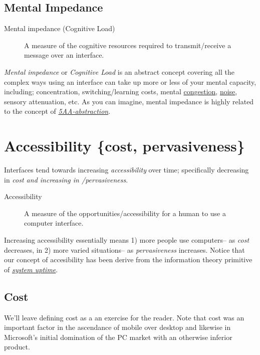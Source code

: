 \documentclass[logo,bsc,singlespacing,parskip]{infthesis}
\begin{document}
\subsection{Mental Impedance}
\label{sec:orgdfe7105}
\medskip
\begin{mdframed}
\begin{description}
\item[{Mental impedance\label{mental impedance} (Cognitive Load\label{cognitive load})}] A measure of the cognitive resources required to transmit/receive a message over an interface.
\end{description}
\end{mdframed}

\emph{Mental impedance} or \emph{Cognitive Load} is an abstract concept covering all the complex ways using an interface can take up more or less of your mental capacity, including; concentration, switching/learning costs, mental \hyperref[org8994918]{congestion}, \hyperref[noise]{noise}, sensory attenuation, etc.
As you can imagine, mental impedance is highly related to the concept of \emph{\hyperref[abstraction]{5AA-abstraction}}.

\section{Accessibility \{cost, pervasiveness\}}
\label{sec:org53b1bb7}
Interfaces tend towards increasing \emph{accessibility} over time; specifically decreasing in \emph{cost and increasing in /pervasiveness}.

\begin{mdframed}
\begin{description}
\item[{Accessibility\label{accessibility}}] A measure of the opportunities/accessibility for a human to use a computer interface.
\end{description}
\end{mdframed}

Increasing accessibility essentially means 1) more people use computers-- as \emph{cost} decreases, in 2) more varied situations-- as \emph{pervasiveness} increases.
Notice that our concept of accesibility has been derive from the information theory primitive of \emph{\hyperref[org187665d]{system uptime}}.
\subsection{Cost}
\label{sec:org737bf5b}
We'll leave defining cost as a an exercise for the reader.
Note that cost was an important factor in the ascendance of mobile over desktop and likewise in Microsoft's initial domination of the PC market with an otherwise inferior product.
\end{document}
